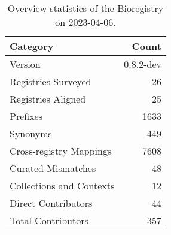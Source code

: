 \begin{table}
\caption{Overview statistics of the Bioregistry on 2023-04-06.}
\label{tab:bioregistry-summary}
\begin{tabular}{lr}
\toprule
Category & Count \\
\midrule
Version & 0.8.2-dev \\
Registries Surveyed & 26 \\
Registries Aligned & 25 \\
Prefixes & 1633 \\
Synonyms & 449 \\
Cross-registry Mappings & 7608 \\
Curated Mismatches & 48 \\
Collections and Contexts & 12 \\
Direct Contributors & 44 \\
Total Contributors & 357 \\
\bottomrule
\end{tabular}
\end{table}
